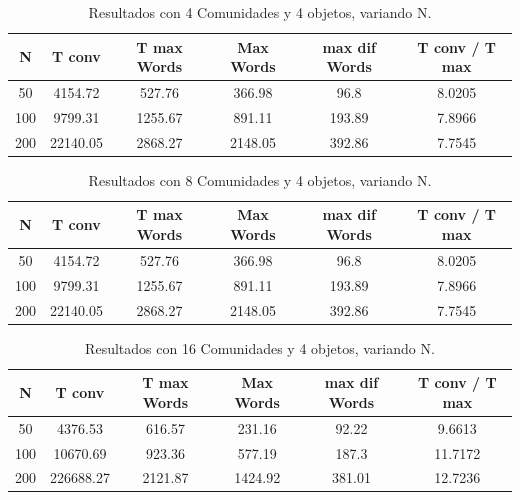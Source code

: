 \documentclass[runningheads]{llncs}
\begin{document}
\begin{table}[H]
	\centering
	\caption{Resultados con 4 Comunidades y 4 objetos, variando N.}\label{tab1}
	\begin{tabular}{|c|c|c|c|c|c|}
		\hline
		N &  T conv & T max Words & Max Words & max dif Words & T conv / T max  \\
		\hline
		50 & 4154.72 &   527.76 & 366.98 & 96.8 & 8.0205 \\
		\hline
		100 & 9799.31 &   1255.67 & 891.11 & 193.89 & 7.8966\\
		\hline
		200 & 22140.05 &  2868.27 & 2148.05 & 392.86 & 7.7545 \\
		\hline
	\end{tabular}
	\label{table:res1}
\end{table}

\begin{table}[H]
	\centering
	\caption{Resultados con 8 Comunidades y 4 objetos, variando N.}\label{tab2}
	\begin{tabular}{|c|c|c|c|c|c|}
		\hline
		N &  T conv & T max Words & Max Words & max dif Words & T conv / T max  \\
		\hline
		50 & 4154.72 &   527.76 & 366.98 & 96.8 & 8.0205 \\
		\hline
		100 & 9799.31 &   1255.67 & 891.11 & 193.89 & 7.8966\\
		\hline
		200 & 22140.05 &  2868.27 & 2148.05 & 392.86 & 7.7545 \\
		\hline
	\end{tabular}
	\label{table:res2}
\end{table}



\begin{table}[H]
	\centering
	\caption{Resultados con 16 Comunidades y 4 objetos, variando N.}\label{tab2}
	\begin{tabular}{|c|c|c|c|c|c|}
		\hline
		N &  T conv & T max Words & Max Words & max dif Words & T conv / T max  \\
		\hline
		50 & 4376.53 & 616.57
		& 231.16 & 92.22 & 9.6613 \\
		\hline
		100 & 10670.69 & 923.36
		& 577.19 & 187.3
		& 11.7172\\
		\hline
		200 & 226688.27
		&  2121.87
		& 1424.92 & 381.01
		& 12.7236
		\\
		\hline
	\end{tabular}
	\label{table:res3}
\end{table}
\end{document}

